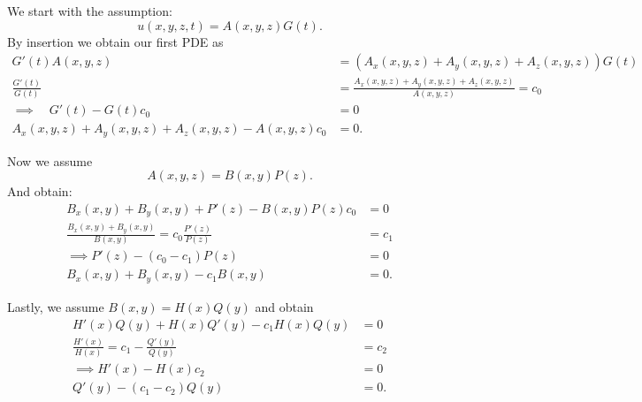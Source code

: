 \begin{derivation}
  We start with the assumption:
  \[ 
  u(x,y,z,t) = A(x,y,z) G(t)
  .\]
  By insertion we obtain our first PDE as
  \begin{align*}
    G'(t) A(x,y,z) &= \left( A_x \left( x,y,z \right) + A_y \left( x,y,z \right) + A_z \left( x,y,z \right) \right) G(t) \\
    \frac{G'(t)}{G(t)} &= \frac{A_x(x,y,z) + A_y(x,y,z) + A_z(x,y,z)}{A(x,y,z)} = c_0 \\
    \implies \quad G'(t) - G(t)c_0 &= 0 \\
    A_x(x,y,z) + A_y(x,y,z) + A_z(x,y,z) - A(x,y,z) c_0 &= 0
  .\end{align*}
  
  Now we assume
  \[ 
  A(x,y,z) = B(x,y)P(z)
  .\]
  And obtain:
  \begin{align*}
      B_x(x,y) + B_y(x,y) + P'(z) - B(x,y)P(z) c_0 &= 0 \\
      \frac{B_x(x,y) + B_y(x,y)}{B(x,y)} = c_0 \frac{P'(z)}{P(z)} &= c_1\\
      \implies P'(z) - \left( c_0 - c_1 \right)P(z) &= 0 \\
       B_x(x,y) + B_y(x,y) - c_1 B(x,y) &= 0
  .\end{align*}
  
  Lastly, we assume $B(x,y) = H(x) Q(y)$ and obtain
  \begin{align*}
    H'(x) Q(y) + H(x) Q'(y) - c_1 H(x) Q(y) &= 0 \\
    \frac{H'(x)}{H(x)} = c_1 - \frac{Q'(y)}{Q(y)} &= c_2 \\
    \implies H'(x) - H(x) c_2 &= 0 \\
    Q'(y) - \left( c_1 - c_2 \right)Q(y) &= 0
  .\end{align*}
\end{derivation}

